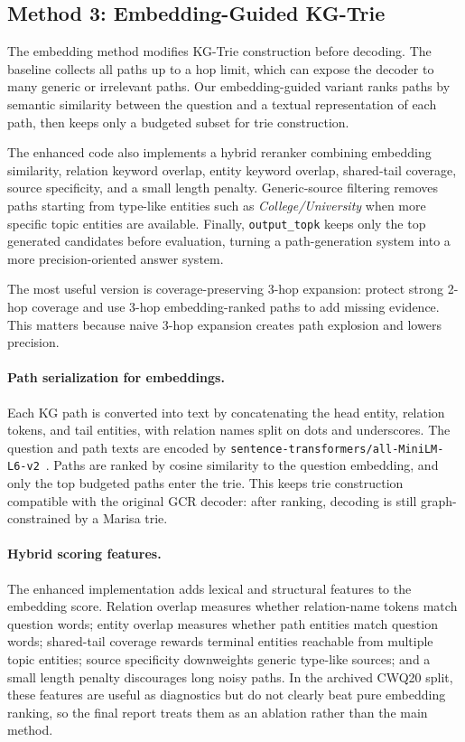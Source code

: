 \documentclass[10pt,twocolumn]{article}
\newcommand{\code}[1]{\texttt{#1}}
\begin{document}
\subsection{Method 3: Embedding-Guided KG-Trie}
The embedding method modifies KG-Trie construction before decoding. The baseline collects all paths up to a hop limit, which can expose the decoder to many generic or irrelevant paths. Our embedding-guided variant ranks paths by semantic similarity between the question and a textual representation of each path, then keeps only a budgeted subset for trie construction.

The enhanced code also implements a hybrid reranker combining embedding similarity, relation keyword overlap, entity keyword overlap, shared-tail coverage, source specificity, and a small length penalty. Generic-source filtering removes paths starting from type-like entities such as \emph{College/University} when more specific topic entities are available. Finally, \code{output\_topk} keeps only the top generated candidates before evaluation, turning a path-generation system into a more precision-oriented answer system.

The most useful version is coverage-preserving 3-hop expansion: protect strong 2-hop coverage and use 3-hop embedding-ranked paths to add missing evidence. This matters because naive 3-hop expansion creates path explosion and lowers precision.

\paragraph{Path serialization for embeddings.}
Each KG path is converted into text by concatenating the head entity, relation tokens, and tail entities, with relation names split on dots and underscores. The question and path texts are encoded by \code{sentence-transformers/all-MiniLM-L6-v2}~\cite{reimers2019sentencebert,wang2020minilm}. Paths are ranked by cosine similarity to the question embedding, and only the top budgeted paths enter the trie. This keeps trie construction compatible with the original GCR decoder: after ranking, decoding is still graph-constrained by a Marisa trie.

\paragraph{Hybrid scoring features.}
The enhanced implementation adds lexical and structural features to the embedding score. Relation overlap measures whether relation-name tokens match question words; entity overlap measures whether path entities match question words; shared-tail coverage rewards terminal entities reachable from multiple topic entities; source specificity downweights generic type-like sources; and a small length penalty discourages long noisy paths. In the archived CWQ20 split, these features are useful as diagnostics but do not clearly beat pure embedding ranking, so the final report treats them as an ablation rather than the main method.
\end{document}
